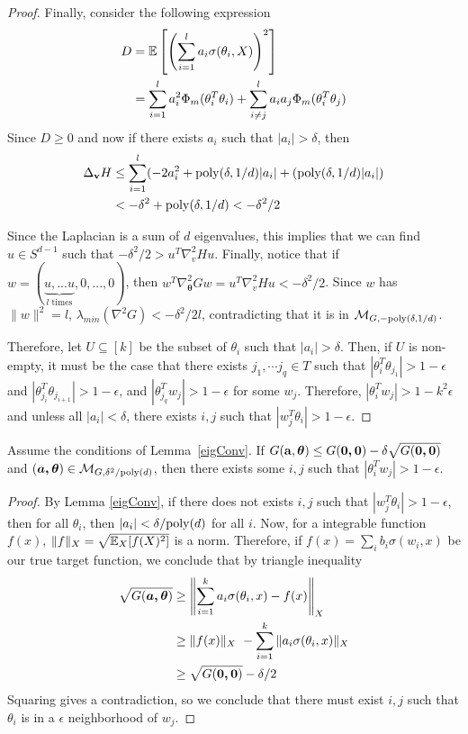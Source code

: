 \begin{proof}
%
Finally, consider the following expression
%
\begin{align*}
D & = \expt\left[\left( \sum_{i=1}^l a_i \sigma(\theta_i,X)\right)^2\right] \\
%
& =\sum_{i=1}^l a_i^2\Phi_m(\theta_i^T\theta_i) + \sum_{i \neq j}^l
  a_ia_j\Phi_m(\theta_i^T\theta_j)
\end{align*}
%
Since $D \geq 0$ and now if there exists $a_i$ such that $|a_i| > \delta$, then
%
\begin{align*}
\Delta_{{\bf v}}H & \leq  \sum_{i=1}^l (-2a_i^2 +\mathrm{poly}(\delta,1/d) |a_i|+(\mathrm{poly}(\delta,1/d)|a_i|) \\
& < -\delta^2 + \mathrm{poly}(\delta,1/d) < -\delta^2/2
\end{align*}

Since the Laplacian is a sum of $d$ eigenvalues, this implies that we can find $u \in S^{d-1}$ such that $-\delta^2/2 > u^T\nabla^2_v H u$. Finally, notice that if $w = (\underbrace{u,...u}_{l {\textrm{ times}}},0,...,0)$, then $w^T\nabla^2_{\boldsymbol{\theta}} G w = u^T\nabla^2_v H u < -\delta^2/2$. Since $w$ has $\|w\|^2 = l$, $\lambda_{min}(\nabla^2 G) < -\delta^2/2l$, contradicting that it is in $\mathcal{M}_{G, -\mathrm{poly}(\delta,1/d)}$. 

Therefore, let $U \subseteq [k]$ be the subset of $\theta_i$ such that $|a_i|>\delta$. Then, if $U$ is non-empty, it must be the case that there exists ${j_1},\cdots {j_q} \in T$ such that
$|\theta_i^T\theta_{j_1}| > 1-\epsilon$ and
$|\theta_{j_{i}}^T\theta_{j_{i+1}}| > 1-\epsilon$, and
$|\theta_{j_q}^Tw_j| > 1-\epsilon$ for some $w_j$. Therefore,
$|\theta_i^Tw_j| > 1- k^2\epsilon$ and unless all $|a_i| <\delta$,  there exists $i, j$ such that $|w_j^T\theta_i| > 1-\epsilon$.
\end{proof}

\begin{lemma}\label{eigRes}
  Assume the conditions of Lemma~\ref{eigConv}. If
$G({\bf a, \boldsymbol{\theta}}) \leq G(\boldsymbol{0,0}) - \delta\sqrt{G(\boldsymbol{0,0})}$
  and $(\boldsymbol{a,\theta}) \in \mathcal{M}_{G,\delta^2/\mathrm{poly}(d)}$,
  then there exists some $i, j$ such that $|\theta_i^Tw_j| > 1- \epsilon$.
\end{lemma}
 
 \begin{proof}
   By Lemma \ref{eigConv}, if there does not exists $i, j$ such that
   $|w_j^T\theta_i| > 1-\epsilon$, then for all $\theta_i$, then
   $|a_i| < \delta/\mathrm{poly}(d)$ for all $i$. Now, for a integrable
   function $f(x)$, $\| f\|_X = \sqrt{\operatorname*{\mathbb{E}}_X[f(X)^2]}$ is a
   norm. Therefore, if $f(x) = \sum_i b_i \sigma(w_i,x)$ be our true
   target function, we conclude that by triangle inequality
\begin{align*}
\sqrt{G(\boldsymbol{a,\theta})}  & \geq \left\lVert \sum_{i=1}^k a_i \sigma(\theta_i,x) - f(x) \right\rVert_X \\
&\geq \|f(x)\|_X\ - \sum_{i=1}^k \|a_i\sigma(\theta_i,x) \|_X \\
& \geq
  \sqrt{G(\boldsymbol{0,0})} - \delta/2
\end{align*}
Squaring gives a contradiction, so we conclude that there must exist $i, j$ such that $\theta_i$ is in a $\epsilon$ neighborhood of $w_j$.
 \end{proof}
 
